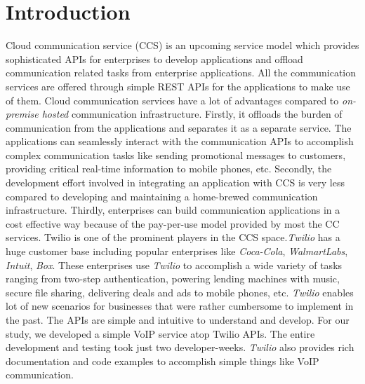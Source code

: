 \section{Introduction}
\label{sec-intro}
Cloud communication service (CCS) is an upcoming service model which provides sophisticated APIs for enterprises to develop applications and offload communication related tasks from enterprise applications. 
All the communication services are offered through simple REST APIs for the applications to make use of them. Cloud communication services have a lot of advantages compared to \textit{on-premise hosted} communication infrastructure. Firstly, it offloads the burden of communication from the applications and separates it as a separate service. The applications can seamlessly interact with the communication APIs to accomplish complex communication tasks like sending promotional messages to customers, providing critical real-time information to mobile phones, etc. Secondly, the development effort involved in integrating an application with CCS is very less compared to developing and maintaining a home-brewed communication infrastructure.
Thirdly, enterprises can build communication applications in a cost effective way because of the pay-per-use model provided by most the CC services. {Twilio} is one of the prominent players in the CCS space.\textit{Twilio} has a huge customer base  including popular enterprises like \textit{Coca-Cola}, \textit{WalmartLabs}, \textit{Intuit}, \textit{Box}. These enterprises use \textit{Twilio} to accomplish a wide variety of tasks ranging from two-step authentication, powering lending machines with music, secure file sharing, delivering deals and ads to mobile phones, etc. \textit{Twilio} enables lot of new scenarios for businesses that were rather cumbersome to implement in the past. The APIs are simple and intuitive to understand and develop. For our study, we developed a simple VoIP service atop Twilio APIs. The entire development and testing took just two developer-weeks. \textit{Twilio} also provides rich documentation and code examples to accomplish simple things like VoIP communication.